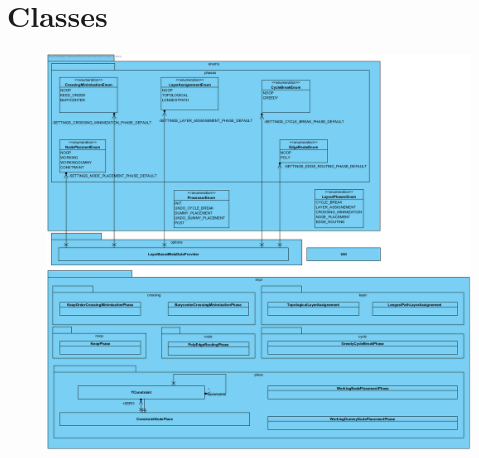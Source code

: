 \section{Classes}

\begin{figure}[H]
\centering
\includegraphics[width=\textwidth,keepaspectratio]{parts/Generated-Class-Diagramm.png}
\end{figure}